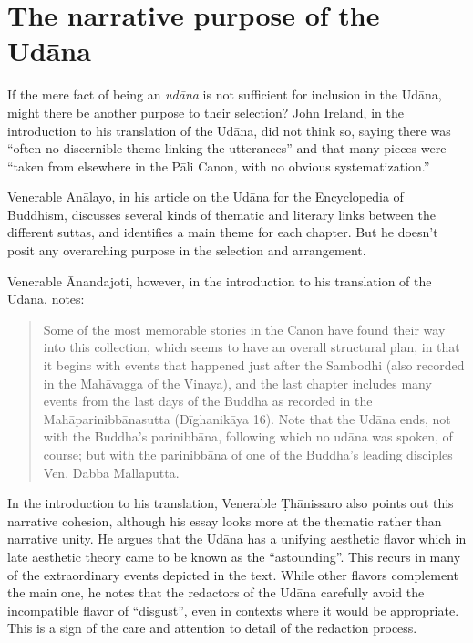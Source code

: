\documentclass[12pt,openany]{book}%
\begin{document}
\section*{The narrative purpose of the \textsanskrit{Udāna}}

If the mere fact of being an \textit{\textsanskrit{udāna}} is not sufficient for inclusion in the \textsanskrit{Udāna}, might there be another purpose to their selection? John Ireland, in the introduction to his translation of the \textsanskrit{Udāna}, did not think so, saying there was “often no discernible theme linking the utterances” and that many pieces were “taken from elsewhere in the \textsanskrit{Pāli} Canon, with no obvious systematization.”

Venerable \textsanskrit{Anālayo}, in his article on the \textsanskrit{Udāna} for the Encyclopedia of Buddhism, discusses several kinds of thematic and literary links between the different suttas, and identifies a main theme for each chapter. But he doesn’t posit any overarching purpose in the selection and arrangement.

Venerable Ānandajoti, however, in the introduction to his translation of the \textsanskrit{Udāna}, notes:

\begin{quotation}%
Some of the most memorable stories in the Canon have found their way into this collection, which seems to have an overall structural plan, in that it begins with events that happened just after the Sambodhi (also recorded in the \textsanskrit{Mahāvagga} of the Vinaya), and the last chapter includes many events from the last days of the Buddha as recorded in the \textsanskrit{Mahāparinibbānasutta} (\textsanskrit{Dīghanikāya} 16). Note that the \textsanskrit{Udāna} ends, not with the Buddha’s \textsanskrit{parinibbāna}, following which no \textsanskrit{udāna} was spoken, of course; but with the \textsanskrit{parinibbāna} of one of the Buddha’s leading disciples Ven. Dabba Mallaputta.

%
\end{quotation}

In the introduction to his translation, Venerable \textsanskrit{Ṭhānissaro} also points out this narrative cohesion, although his essay looks more at the thematic rather than narrative unity. He argues that the \textsanskrit{Udāna} has a unifying aesthetic flavor which in late aesthetic theory came to be known as the “astounding”. This recurs in many of the extraordinary events depicted in the text. While other flavors complement the main one, he notes that the redactors of the \textsanskrit{Udāna} carefully avoid the incompatible flavor of “disgust”, even in contexts where it would be appropriate. This is a sign of the care and attention to detail of the redaction process.
\end{document}
